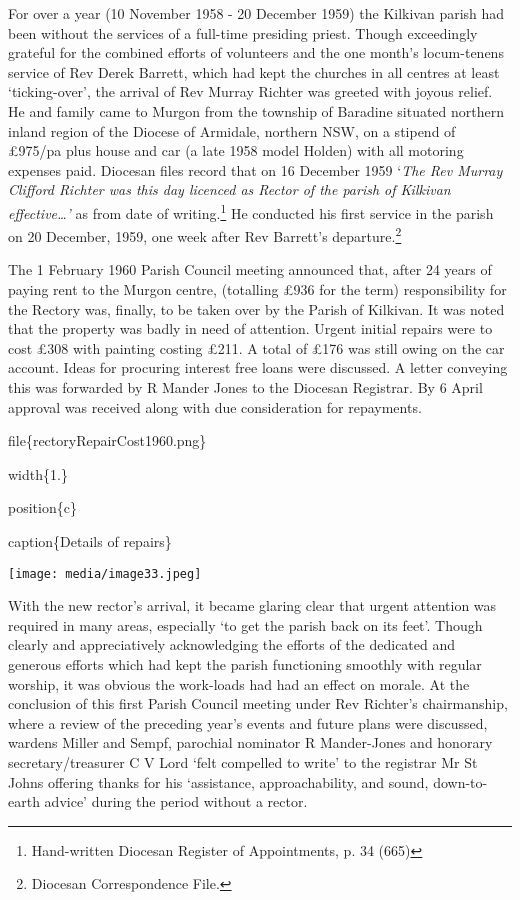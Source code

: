 For over a year (10 November 1958 - 20 December 1959) the Kilkivan parish had been without the services of a full-time presiding priest. Though exceedingly grateful for the combined efforts of volunteers and the one month's locum-tenens service of Rev Derek Barrett, which had kept the churches in all centres at least `ticking-over', the arrival of Rev Murray Richter was greeted with joyous relief. He and family came to Murgon from the township of Baradine situated northern inland region of the Diocese of Armidale, northern NSW, on a stipend of £975/pa plus house and car (a late 1958 model Holden) with all motoring expenses paid. Diocesan files record that on 16 December 1959 `\emph{The Rev Murray Clifford Richter was this day licenced as Rector of the parish of Kilkivan effective\ldots'} as from date of writing.\footnote{Hand-written Diocesan Register of Appointments, p. 34 (665)} He conducted his first service in the parish on 20 December, 1959, one week after Rev Barrett's departure.\footnote{Diocesan Correspondence File.}

The 1 February 1960 Parish Council meeting announced that, after 24 years of paying rent to the Murgon centre, (totalling £936 for the term) responsibility for the Rectory was, finally, to be taken over by the Parish of Kilkivan. It was noted that the property was badly in need of attention. Urgent initial repairs were to cost £308 with painting costing £211. A total of £176 was still owing on the car account. Ideas for procuring interest free loans were discussed. A letter conveying this was forwarded by R Mander Jones to the Diocesan Registrar. By 6 April approval was received along with due consideration for repayments.

file\{rectoryRepairCost1960.png\}

width\{1.\}

position\{c\}

caption\{Details of repairs\}

\texttt{[image: media/image33.jpeg]}

With the new rector's arrival, it became glaring clear that urgent attention was required in many areas, especially `to get the parish back on its feet'. Though clearly and appreciatively acknowledging the efforts of the dedicated and generous efforts which had kept the parish functioning smoothly with regular worship, it was obvious the work-loads had had an effect on morale. At the conclusion of this first Parish Council meeting under Rev Richter's chairmanship, where a review of the preceding year's events and future plans were discussed, wardens Miller and Sempf, parochial nominator R Mander-Jones and honorary secretary/treasurer C V Lord `felt compelled to write' to the registrar Mr St Johns offering thanks for his `assistance, approachability, and sound, down-to-earth advice' during the period without a rector.

